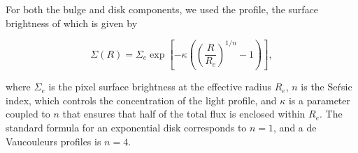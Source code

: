 For both the bulge and disk components, we used the \sersic{} profile, the surface brightness of which is given by  

\begin{equation}
\Sigma(R) = \Sigma_e \exp \left[ -\kappa \left( \left( \frac{R}{R_e}\right)^{1/n} - 1 \right) \right] ,
\label{eq:sersic_fn}
\end{equation}

\noindent
where $\Sigma_e$ is the pixel surface brightness at the effective radius $R_e$, $n$ is the Se\'rsic index, which controls the concentration of the light profile, and $\kappa$ is a parameter coupled to $n$ that ensures that half of the total flux is enclosed within $R_e$.
The standard formula for an exponential disk corresponds to $n=1$, and a de\,Vaucouleurs profiles is $n=4$.

